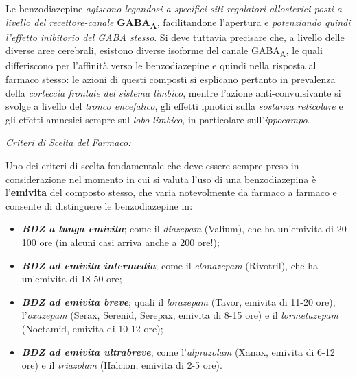 \begin{itemize}
Le benzodiazepine \emph{agiscono legandosi a specifici siti regolatori
allosterici posti a livello del recettore-canale}
\textbf{GABA\textsubscript{A}}, facilitandone l'apertura e
\emph{potenziando quindi l'effetto inibitorio del GABA stesso}. Si deve
tuttavia precisare che, a livello delle diverse aree cerebrali, esistono
diverse isoforme del canale GABA\textsubscript{A}, le quali differiscono
per l'affinità verso le benzodiazepine e quindi nella risposta al
farmaco stesso: le azioni di questi composti si esplicano pertanto in
prevalenza della \emph{corteccia frontale del sistema limbico}, mentre
l'azione anti-convulsivante si svolge a livello del \emph{tronco
encefalico}, gli effetti ipnotici sulla \emph{sostanza reticolare} e gli
effetti amnesici sempre sul \emph{lobo limbico}, in particolare
sull'\emph{ippocampo}.

\emph{\emph{Criteri di Scelta del Farmaco:}}

Uno dei criteri di scelta fondamentale che deve essere sempre preso in
considerazione nel momento in cui si valuta l'uso di una benzodiazepina
è l'\textbf{emivita} del composto stesso, che varia notevolmente da
farmaco a farmaco e consente di distinguere le benzodiazepine in:

\begin{itemize}
\item
  \textbf{\emph{BDZ a lunga emivita}}; come il \emph{diazepam} (Valium),
  che ha un'emivita di 20-100 ore (in alcuni casi arriva anche a 200
  ore!);
\item
  \textbf{\emph{BDZ ad emivita intermedia}}; come il \emph{clonazepam}
  (Rivotril), che ha un'emivita di 18-50 ore;
\item
  \textbf{\emph{BDZ ad emivita breve}}; quali il \emph{lorazepam}
  (Tavor, emivita di 11-20 ore), l'\emph{oxazepam} (Serax, Serenid,
  Serepax, emivita di 8-15 ore) e il \emph{lormetazepam} (Noctamid,
  emivita di 10-12 ore);
\item
  \textbf{\emph{BDZ ad emivita ultrabreve}}, come l'\emph{alprazolam}
  (Xanax, emivita di 6-12 ore) e il \emph{triazolam} (Halcion, emivita
  di 2-5 ore).
\end{itemize}


\end{itemize}
